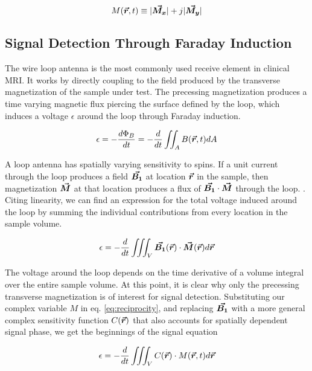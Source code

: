 \begin{equation}\label{eq:M_complex}
    M(\bm{\vec{r}},t) \equiv |\bm{\vec{M_x}}| + j |\bm{\vec{M_y}}|
\end{equation}

\subsection{Signal Detection Through Faraday Induction}
The wire loop antenna is the most commonly used receive element in clinical MRI. It works by directly coupling to the
field produced by the transverse magnetization of the sample under test. The precessing magnetization produces a time
varying magnetic flux piercing the surface defined by the loop, which induces a voltage $\epsilon$ around the loop
through Faraday induction.

\begin{equation}\label{eq:faraday_induction}
    \epsilon = - \frac{d \Phi_B}{dt} = -\frac{d}{dt} \iint_A B(\bm{\vec{r}},t) dA
\end{equation}

A loop antenna has spatially varying sensitivity to spins. If a unit current through the loop produces a field
$\bm{\vec{B_1}}$ at location $\bm{\vec{r}}$ in the sample, then magnetization $\bm{\vec{M}}$ at that location produces a flux of
$\bm{\vec{B_1}} \cdot \bm{\vec{M}}$ through the loop.  \cite{Hoult1979}. Citing linearity, we can find an expression for the
total voltage induced around the loop by summing the individual contributions from every location in the sample volume.

\begin{equation}\label{eq:reciprocity}
    \epsilon = -\frac{d}{dt} \iiint_V \bm{\vec{B_1}}(\bm{\vec{r}}) \cdot \bm{\vec{M}}(\bm{\vec{r}}) d\bm{\vec{r}}
\end{equation}

The voltage around the loop depends on the time derivative of a volume integral over the entire sample volume. At this
point, it is clear why only the precessing transverse magnetization is of interest for signal detection. Substituting
our complex variable $M$ in eq. \ref{eq:reciprocity}, and replacing $\bm{\vec{B_1}}$ with a more general complex sensitivity
function $C(\bm{\vec{r}})$ that also accounts for spatially dependent signal phase, we get the beginnings of the signal
equation

\begin{equation}\label{eq:signal_1}
    \epsilon = -\frac{d}{dt} \iiint_V C(\bm{\vec{r}}) \cdot M(\bm{\vec{r}},t) d\bm{\vec{r}}
\end{equation}

